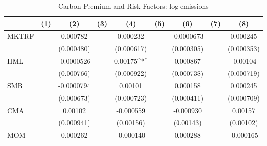 \begin{table}[htbp]\centering
\def\sym#1{\ifmmode^{#1}\else\(^{#1}\)\fi}
\caption{Carbon Premium and Risk Factors: log emissions}
\begin{tabular}{l*{8}{c}}
\hline\hline
                    &\multicolumn{1}{c}{(1)}         &\multicolumn{1}{c}{(2)}         &\multicolumn{1}{c}{(3)}         &\multicolumn{1}{c}{(4)}         &\multicolumn{1}{c}{(5)}         &\multicolumn{1}{c}{(6)}         &\multicolumn{1}{c}{(7)}         &\multicolumn{1}{c}{(8)}         \\
\hline
MKTRF               &                     &    0.000782         &                     &    0.000232         &                     &  -0.0000673         &                     &    0.000245         \\
                    &                     &  (0.000480)         &                     &  (0.000617)         &                     &  (0.000305)         &                     &  (0.000353)         \\
[1em]
HML                 &                     &  -0.0000526         &                     &     0.00175\sym{*}  &                     &    0.000867         &                     &    -0.00104         \\
                    &                     &  (0.000766)         &                     &  (0.000922)         &                     &  (0.000738)         &                     &  (0.000719)         \\
[1em]
SMB                 &                     &  -0.0000794         &                     &     0.00101         &                     &    0.000158         &                     &    0.000245         \\
                    &                     &  (0.000673)         &                     &  (0.000723)         &                     &  (0.000411)         &                     &  (0.000709)         \\
[1em]
CMA                 &                     &     0.00102         &                     &   -0.000559         &                     &   -0.000930         &                     &     0.00157         \\
                    &                     &  (0.000941)         &                     &   (0.00156)         &                     &   (0.00143)         &                     &   (0.00102)         \\
[1em]
MOM                 &                     &    0.000262         &                     &   -0.000140         &                     &    0.000288         &                     &   -0.000165         \\

\end{tabular}
\end{table}
